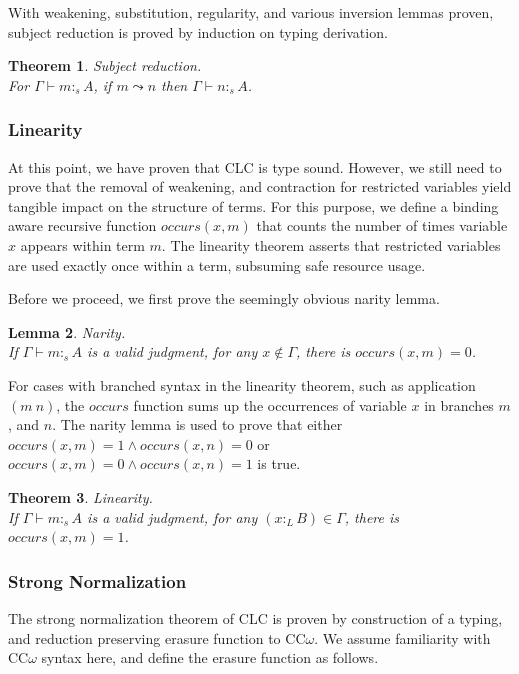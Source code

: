 \documentclass{article}
\newtheorem{theorem}{Theorem}[section]
\newtheorem{lemma}[theorem]{Lemma}
\theoremstyle{definition}
\newcommand{\ltype}{:_{\scriptscriptstyle L}}
\newcommand{\stype}[1]{:_#1}
\newcommand{\pstep}{\leadsto}
\begin{document}
  With weakening, substitution, regularity, and various inversion lemmas proven, subject reduction is proved by induction on typing derivation.

  \begin{theorem} Subject reduction. \\
    For $\Gamma \vdash m \stype{s} A$, if $m \pstep n$ then $\Gamma \vdash n \stype{s} A$.
  \end{theorem}

  \subsubsection{Linearity}
  At this point, we have proven that CLC is type sound. However, we still need to prove that the removal of weakening, and contraction for restricted variables yield tangible impact on the structure of terms. For this purpose, we define a binding aware recursive function $occurs(x, m)$ that counts the number of times variable $x$ appears within term $m$. The linearity theorem asserts that restricted variables are used exactly once within a term, subsuming safe resource usage.

  Before we proceed, we first prove the seemingly obvious narity lemma. 

  \begin{lemma} Narity. \\
    If $\Gamma \vdash m \stype{s} A$ is a valid judgment, for any $x \notin \Gamma$, there is $occurs(x, m) = 0$.
  \end{lemma}

  For cases with branched syntax in the linearity theorem, such as application $(m\ n)$, the $occurs$ function sums up the occurrences of variable $x$ in branches $m$, and $n$. The narity lemma is used to prove that either $occurs(x, m) = 1 \wedge occurs(x, n) = 0$ or $occurs(x, m) = 0 \wedge occurs(x, n) = 1$ is true.

  \begin{theorem} Linearity. \\
    If $\Gamma \vdash m \stype{s} A$ is a valid judgment, for any $(x \ltype B) \in \Gamma$, there is $occurs(x, m) = 1$.
  \end{theorem}

  \subsubsection{Strong Normalization}
  The strong normalization theorem of CLC is proven by construction of a typing, and reduction preserving erasure function to CC$\omega$. We assume familiarity with CC$\omega$ syntax here, and define the erasure function as follows.
\end{document}
